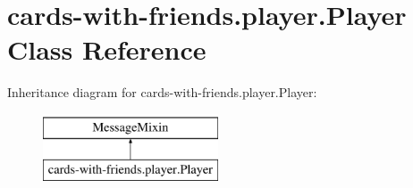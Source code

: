 \hypertarget{classcards-with-friends_1_1player_1_1_player}{\section{cards-\/with-\/friends.player.\-Player Class Reference}
\label{classcards-with-friends_1_1player_1_1_player}
}
Inheritance diagram for cards-\/with-\/friends.player.\-Player\-:\begin{figure}[H]
\begin{center}
\leavevmode
\includegraphics[height=2.000000cm]{classcards-with-friends_1_1player_1_1_player}
\end{center}
\end{figure}
